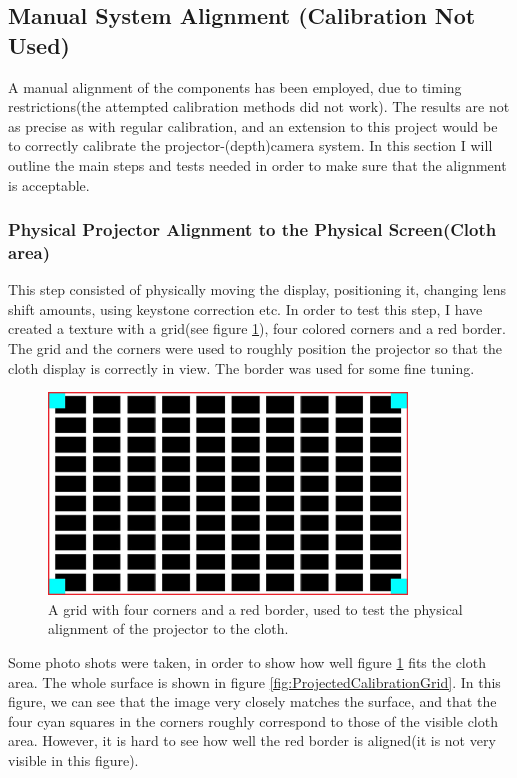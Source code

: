 \documentclass[]{article}
\begin{document}
\subsection{Manual System Alignment (Calibration Not Used)}
\label{sec:ManualAlignment}

A manual alignment of the components has been employed, due to timing restrictions(the attempted calibration methods did not work). The results are not as precise as with regular calibration, and an extension to this project would be to correctly calibrate the projector-(depth)camera system. In this section I will outline the main steps and tests needed in order to make sure that the alignment is acceptable.

\subsubsection{Physical Projector Alignment to the Physical Screen(Cloth area)}

This step consisted of physically moving the display, positioning it, changing lens shift amounts, using keystone correction etc. In order to test this step, I have created a texture with a grid(see figure \ref{fig:CalibrationGrid}), four colored corners and a red border. The grid and the corners were used to roughly position the projector so that the cloth display is correctly in view. The border was used for some fine tuning. 

\begin{figure}[hbtp]
    \centering
    \includegraphics[width=0.85\textwidth]{figures/CalibrationGrid.jpg}
    \caption{A grid with four corners and a red border, used to test the physical alignment of the projector to the cloth.}
    \label{fig:CalibrationGrid}
\end{figure}

Some photo shots were taken, in order to show how well figure \ref{fig:CalibrationGrid} fits the cloth area. The whole surface is shown in figure \ref{fig:ProjectedCalibrationGrid}. In this figure, we can see that the image very closely matches the surface, and that the four cyan squares in the corners roughly correspond to those of the visible cloth area. However, it is hard to see how well the red border is aligned(it is not very visible in this figure). 
\end{document}
